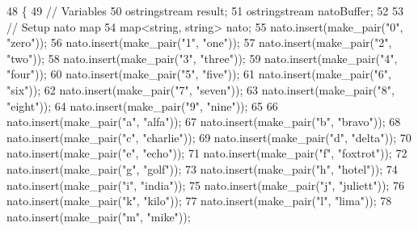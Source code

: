 \begin{DoxyCode}
48                                                                   \{
49     \textcolor{comment}{// Variables}
50     ostringstream result;
51     ostringstream natoBuffer;
52 
53     \textcolor{comment}{// Setup nato map}
54     map<string, string> nato;
55     nato.insert(make\_pair(\textcolor{stringliteral}{"0"}, \textcolor{stringliteral}{"zero"}));
56     nato.insert(make\_pair(\textcolor{stringliteral}{"1"}, \textcolor{stringliteral}{"one"}));
57     nato.insert(make\_pair(\textcolor{stringliteral}{"2"}, \textcolor{stringliteral}{"two"}));
58     nato.insert(make\_pair(\textcolor{stringliteral}{"3"}, \textcolor{stringliteral}{"three"}));
59     nato.insert(make\_pair(\textcolor{stringliteral}{"4"}, \textcolor{stringliteral}{"four"}));
60     nato.insert(make\_pair(\textcolor{stringliteral}{"5"}, \textcolor{stringliteral}{"five"}));
61     nato.insert(make\_pair(\textcolor{stringliteral}{"6"}, \textcolor{stringliteral}{"six"}));
62     nato.insert(make\_pair(\textcolor{stringliteral}{"7"}, \textcolor{stringliteral}{"seven"}));
63     nato.insert(make\_pair(\textcolor{stringliteral}{"8"}, \textcolor{stringliteral}{"eight"}));
64     nato.insert(make\_pair(\textcolor{stringliteral}{"9"}, \textcolor{stringliteral}{"nine"}));
65 
66     nato.insert(make\_pair(\textcolor{stringliteral}{"a"}, \textcolor{stringliteral}{"alfa"}));
67     nato.insert(make\_pair(\textcolor{stringliteral}{"b"}, \textcolor{stringliteral}{"bravo"}));
68     nato.insert(make\_pair(\textcolor{stringliteral}{"c"}, \textcolor{stringliteral}{"charlie"}));
69     nato.insert(make\_pair(\textcolor{stringliteral}{"d"}, \textcolor{stringliteral}{"delta"}));
70     nato.insert(make\_pair(\textcolor{stringliteral}{"e"}, \textcolor{stringliteral}{"echo"}));
71     nato.insert(make\_pair(\textcolor{stringliteral}{"f"}, \textcolor{stringliteral}{"foxtrot"}));
72     nato.insert(make\_pair(\textcolor{stringliteral}{"g"}, \textcolor{stringliteral}{"golf"}));
73     nato.insert(make\_pair(\textcolor{stringliteral}{"h"}, \textcolor{stringliteral}{"hotel"}));
74     nato.insert(make\_pair(\textcolor{stringliteral}{"i"}, \textcolor{stringliteral}{"india"}));
75     nato.insert(make\_pair(\textcolor{stringliteral}{"j"}, \textcolor{stringliteral}{"juliett"}));
76     nato.insert(make\_pair(\textcolor{stringliteral}{"k"}, \textcolor{stringliteral}{"kilo"}));
77     nato.insert(make\_pair(\textcolor{stringliteral}{"l"}, \textcolor{stringliteral}{"lima"}));
78     nato.insert(make\_pair(\textcolor{stringliteral}{"m"}, \textcolor{stringliteral}{"mike"}));

\end{DoxyCode}
